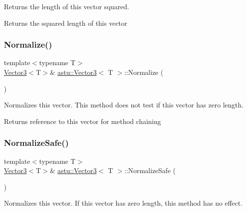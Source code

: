 Returns the length of this vector squared.

\begin{DoxyReturn}{Returns}
the squared length of this vector 
\end{DoxyReturn}
\mbox{\label{classastu_1_1Vector3_a6cac4790b57eb2db4b1d87d8304547f1}} 
\subsubsection{\texorpdfstring{Normalize()}{Normalize()}}
{\footnotesize\ttfamily template$<$typename T$>$ \\
\hyperlink{classastu_1_1Vector3}{Vector3}$<$T$>$\& \hyperlink{classastu_1_1Vector3}{astu\+::\+Vector3}$<$ T $>$\+::Normalize (\begin{DoxyParamCaption}{ }\end{DoxyParamCaption})\hspace{0.3cm}{\ttfamily [inline]}}

Normalizes this vector. This method does not test if this vector has zero length.

\begin{DoxyReturn}{Returns}
reference to this vector for method chaining 
\end{DoxyReturn}
\mbox{\label{classastu_1_1Vector3_a896ab2b924daa9f9348f86b3eb50e428}} 
\subsubsection{\texorpdfstring{Normalize\+Safe()}{NormalizeSafe()}}
{\footnotesize\ttfamily template$<$typename T$>$ \\
\hyperlink{classastu_1_1Vector3}{Vector3}$<$T$>$\& \hyperlink{classastu_1_1Vector3}{astu\+::\+Vector3}$<$ T $>$\+::Normalize\+Safe (\begin{DoxyParamCaption}{ }\end{DoxyParamCaption})\hspace{0.3cm}{\ttfamily [inline]}}

Normalizes this vector. If this vector has zero length, this method has no effect.

